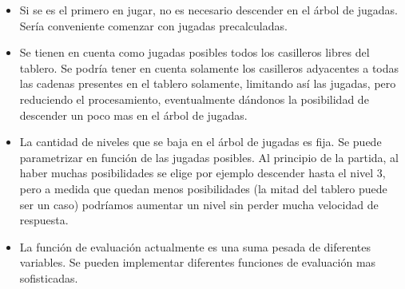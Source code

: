 \documentclass[11pt]{article}
\begin{document}
   \begin{itemize}
     \item Si se es el primero en jugar, no es necesario descender en
       el \'arbol de jugadas. Ser\'ia conveniente comenzar con jugadas
       precalculadas.
     \item Se tienen en cuenta como jugadas posibles todos los
       casilleros libres del tablero. Se podr\'ia tener en cuenta
       solamente los casilleros adyacentes a todas las cadenas
       presentes en el tablero solamente, limitando as\'i las jugadas,
       pero reduciendo el procesamiento, eventualmente d\'andonos la
       posibilidad de descender un poco mas en el \'arbol de jugadas.
     \item La cantidad de niveles que se baja en el \'arbol de jugadas
       es fija. Se puede parametrizar en funci\'on de las jugadas
       posibles. Al principio de la partida, al haber muchas
       posibilidades se elige por ejemplo descender hasta el nivel 3,
       pero a medida que quedan menos posibilidades (la mitad del
       tablero puede ser un caso) podr\'iamos aumentar un nivel sin
       perder mucha velocidad de respuesta.
     \item La funci\'on de evaluaci\'on actualmente es una suma pesada
       de diferentes variables. Se pueden implementar diferentes
       funciones de evaluaci\'on mas sofisticadas.
   \end{itemize}
\end{document}

